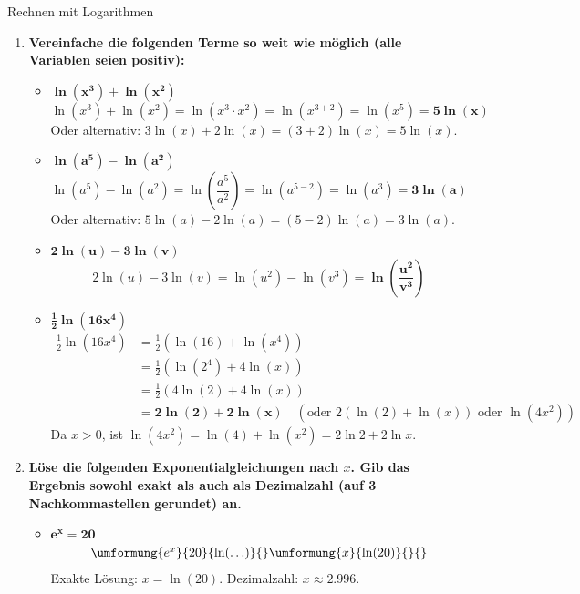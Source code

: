 \begin{loesungsumgebung}{Rechnen mit Logarithmen}

\begin{enumerate}[label=(\alph*)]
    \item \textbf{Vereinfache die folgenden Terme so weit wie möglich (alle Variablen seien positiv):}
    \begin{itemize}
        \item $\mathbf{\ln(x^3) + \ln(x^2)}$
        $$ \ln(x^3) + \ln(x^2) = \ln(x^3 \cdot x^2) = \ln(x^{3+2}) = \ln(x^5) = \mathbf{5\ln(x)} $$
        Oder alternativ: $3\ln(x) + 2\ln(x) = (3+2)\ln(x) = 5\ln(x)$.

        \item $\mathbf{\ln(a^5) - \ln(a^2)}$
        $$ \ln(a^5) - \ln(a^2) = \ln\left(\frac{a^5}{a^2}\right) = \ln(a^{5-2}) = \ln(a^3) = \mathbf{3\ln(a)} $$
        Oder alternativ: $5\ln(a) - 2\ln(a) = (5-2)\ln(a) = 3\ln(a)$.

        \item $\mathbf{2\ln(u) - 3\ln(v)}$
        $$ 2\ln(u) - 3\ln(v) = \ln(u^2) - \ln(v^3) = \mathbf{\ln\left(\frac{u^2}{v^3}\right)} $$

        \item $\mathbf{\frac{1}{2}\ln(16x^4)}$
        \begin{align*} \frac{1}{2}\ln(16x^4) &= \frac{1}{2}(\ln(16) + \ln(x^4)) \\ &= \frac{1}{2}(\ln(2^4) + 4\ln(x)) \\ &= \frac{1}{2}(4\ln(2) + 4\ln(x)) \\ &= \mathbf{2\ln(2) + 2\ln(x)} \quad (\text{oder } 2(\ln(2) + \ln(x)) \text{ oder } \ln(4x^2)) \end{align*}
        Da $x>0$, ist $\ln(4x^2) = \ln(4) + \ln(x^2) = 2\ln 2 + 2\ln x$.
    \end{itemize}

    \item \textbf{Löse die folgenden Exponentialgleichungen nach $x$. Gib das Ergebnis sowohl exakt als auch als Dezimalzahl (auf 3 Nachkommastellen gerundet) an.}
    \begin{itemize}
        \item $\mathbf{e^x = 20}$
        $$
        \begin{array}{r c l c l}
        \umformung{e^x}{20}{\ln(\ldots)}{}
        \umformung{x}{\ln(20)}{}{}
        \end{array}
        $$
        Exakte Lösung: $x = \ln(20)$.
        Dezimalzahl: $x \approx \mathbf{2.996}$.


\end{itemize}
\end{enumerate}
\end{loesungsumgebung}

